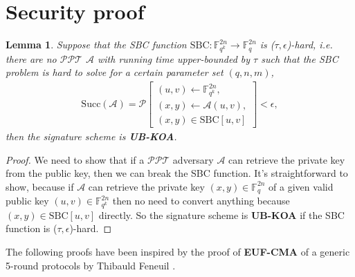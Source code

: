\documentclass[english]{article}
\newtheorem{lemma}{Lemma}[section]
\begin{document}
\section{Security proof}\label{appendix:proof}
	\begin{lemma}
		Suppose that the SBC function $\text{SBC}: \mathbb{F}_{q^k}^{2n} \rightarrow \mathbb{F}_{q}^{2n}$ is ($\tau, \epsilon$)-hard, i.e. there are no $\mathcal{PPT}$ $\mathcal{A}$ with running time upper-bounded by $\tau$ such that the SBC problem is hard to solve for a certain parameter set $(q, n, m)$,
		\begin{align*}
			\text{Succ}(\mathcal{A}) = \mathcal{P}\left[
			\begin{array}{l}
				(u, v) \leftarrow \mathbb{F}_{q^k}^{2n}, \\
				(x, y) \leftarrow \mathcal{A}(u, v), \\
				(x, y) \in \text{SBC}[u, v]
			\end{array}
			\right] < \epsilon,
		\end{align*}
		then the signature scheme is \textbf{UB-KOA}.
	\end{lemma}
	\begin{proof}
		We need to show that if a $\mathcal{PPT}$ adversary $\mathcal{A}$ can retrieve the private key from the public key, then we can break the SBC function.
		It's straightforward to show, because if $\mathcal{A}$ can retrieve the private key $(x, y) \in \mathbb{F}_{q}^{2n}$ of a given valid public key $(u, v) \in \mathbb{F}_{q^k}^{2n}$ then no need to convert anything because $(x, y) \in \text{SBC}[u, v]$ directly. So the signature scheme is \textbf{UB-KOA} if the SBC function is ($\tau, \epsilon$)-hard.
	\end{proof}
	
	The following proofs have been inspired by the proof of \textbf{EUF-CMA} of a generic 5-round protocols by Thibauld Feneuil \cite{feneu2023}.
	
\end{document}
